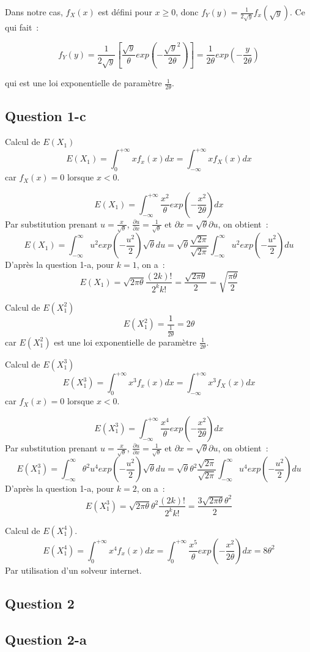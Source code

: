 \documentclass[]{book}
\theoremstyle{definition}
\begin{document}
Dans notre cas, $f_{X}(x)$ est d\'efini pour $x \geq 0$, donc $f_{Y}(y)=\frac{1}{2\sqrt{y}}f_{x}(\sqrt{y})$. Ce qui fait~:

$$
f_{Y}(y) = \frac{1}{2\sqrt{y}} \left[ \frac{\sqrt{y}}{\theta}exp \left( -\frac{\sqrt{y}^2}{2\theta} \right) \right] = \frac{1}{2\theta} exp \left( -\frac{y}{2\theta} \right)
$$

qui est une loi exponentielle de param\`etre $\frac{1}{2\theta}$.

\subsection*{Question 1-c}
Calcul de $E(X_1)$
$$
E(X_1) = \int_{0}^{+\infty} x f_{x}(x) dx = \int_{-\infty}^{+\infty} x f_{X}(x) dx
$$
car $f_{X}(x) = 0$ lorsque $x < 0$.

$$
E(X_1) = \int_{-\infty}^{+\infty} \frac{x^2}{\theta} exp \left( -\frac{x^2}{2\theta}\right) dx
$$
Par substitution prenant $u = \frac{x}{\sqrt{\theta}}$, $\frac{\partial u}{\partial x} = \frac{1}{\sqrt{\theta}}$ et ${\partial x} = \sqrt{\theta}{\partial u}$, on obtient~:
$$
E(X_1) = \int_{-\infty}^{\infty} u^2 exp \left( -\frac{u^2}{2}\right) \sqrt{\theta} du = \sqrt{\theta} \frac{\sqrt{2\pi}}{\sqrt{2\pi}} \int_{-\infty}^{\infty} u^2 exp \left( -\frac{u^2}{2}\right)  du 
$$
D'apr\`es la question 1-a, pour $k=1$, on a~:
$$
E(X_1) = \sqrt{2\pi\theta}\frac{(2k)!}{2^k k!} = \frac{\sqrt{2\pi\theta}}{2} = \sqrt{\frac{\pi\theta}{2}}
$$

Calcul de $E(X_1^2)$
$$
E(X_1^2) = \frac{1}{\frac{1}{2\theta}} = {2\theta}
$$
car $E(X_1^2)$ est une loi exponentielle de param\`etre $\frac{1}{2\theta}$.


Calcul de $E(X_1^3)$
$$
E(X_1^3) = \int_{0}^{+\infty} x^3 f_{x}(x) dx = \int_{-\infty}^{+\infty} x^3 f_{X}(x) dx
$$
car $f_{X}(x) = 0$ lorsque $x < 0$.

$$
E(X_1^3) = \int_{-\infty}^{+\infty} \frac{x^4}{\theta} exp \left( -\frac{x^2}{2\theta}\right) dx
$$
Par substitution prenant $u = \frac{x}{\sqrt{\theta}}$, $\frac{\partial u}{\partial x} = \frac{1}{\sqrt{\theta}}$ et ${\partial x} = \sqrt{\theta}{\partial u}$, on obtient~:
$$
E(X_1^3) = \int_{-\infty}^{\infty} \theta^2 u^4 exp \left( -\frac{u^2}{2}\right) \sqrt{\theta} du = \sqrt{\theta}\theta^2 \frac{\sqrt{2\pi}}{\sqrt{2\pi}} \int_{-\infty}^{\infty} u^4 exp \left( -\frac{u^2}{2}\right)  du 
$$
D'apr\`es la question 1-a, pour $k=2$, on a~:
$$
E(X_1^3) = \sqrt{2\pi\theta}\theta^2\frac{(2k)!}{2^k k!} = \frac{3\sqrt{2\pi\theta}\theta^2}{2} 
$$

Calcul de $E(X_1^4)$.
$$
E(X_1^4) = \int_{0}^{+\infty} x^4 f_{x}(x) dx = \int_{0}^{+\infty} \frac{x^5}{\theta} exp \left( -\frac{x^2}{2\theta}\right) dx = 8\theta^2 
$$
Par utilisation d'un solveur internet.

\subsection*{Question 2}
\subsection*{Question 2-a}
\end{document}
